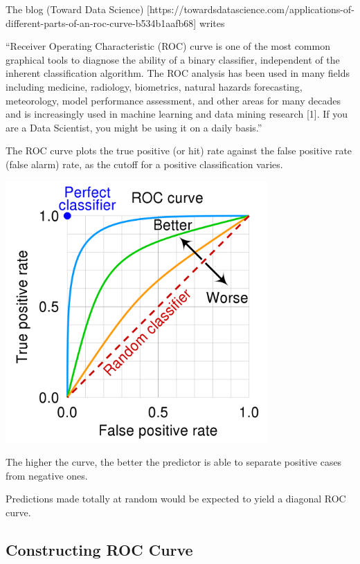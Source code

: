 \documentclass[
  letterpaper,
  DIV=11,
  numbers=noendperiod]{scrreprt}
\begin{document}
The blog (Toward Data Science)
{[}https://towardsdatascience.com/applications-of-different-parts-of-an-roc-curve-b534b1aafb68{]}
writes

``Receiver Operating Characteristic (ROC) curve is one of the most
common graphical tools to diagnose the ability of a binary classifier,
independent of the inherent classification algorithm. The ROC analysis
has been used in many fields including medicine, radiology, biometrics,
natural hazards forecasting, meteorology, model performance assessment,
and other areas for many decades and is increasingly used in machine
learning and data mining research {[}1{]}. If you are a Data Scientist,
you might be using it on a daily basis.''

The ROC curve plots the true positive (or hit) rate against the false
positive rate (false alarm) rate, as the cutoff for a positive
classification varies.

\includegraphics[width=0.75\textwidth,height=\textheight]{Roc_Curve.png}

The higher the curve, the better the predictor is able to separate
positive cases from negative ones.

Predictions made totally at random would be expected to yield a diagonal
ROC curve.

\subsection{Constructing ROC Curve}\label{constructing-roc-curve}
\end{document}
